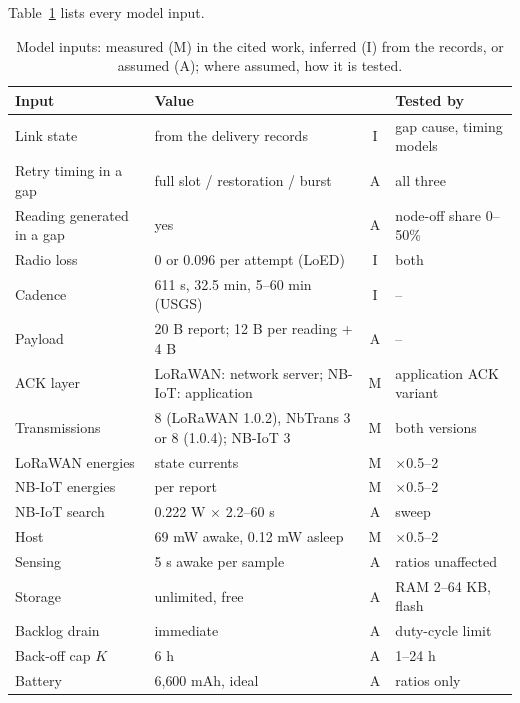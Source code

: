 \documentclass[journal]{IEEEtran}
\begin{document}
Table~\ref{tab:s-assumptions} lists every model input.

\begin{table}[t]
\centering
\caption{Model inputs: measured (M) in the cited work, inferred (I) from the records, or assumed (A); where assumed, how it is tested.}
\label{tab:s-assumptions}
\scriptsize
\setlength{\tabcolsep}{2pt}
\begin{tabular}{@{}p{2.4cm}p{3.6cm}cp{1.9cm}@{}}
\toprule
Input & Value & & Tested by \\
\midrule
Link state & from the delivery records & I & gap cause, timing models \\
Retry timing in a gap & full slot / restoration / burst & A & all three \\
Reading generated in a gap & yes & A & node-off share 0--50\% \\
Radio loss & 0 or 0.096 per attempt (LoED) & I & both \\
Cadence & 611 s, 32.5 min, 5--60 min (USGS) & I & -- \\
Payload & 20 B report; 12 B per reading + 4 B & A & -- \\
ACK layer & LoRaWAN: network server; NB-IoT: application & M & application ACK variant \\
Transmissions & 8 (LoRaWAN 1.0.2), NbTrans 3 or 8 (1.0.4); NB-IoT 3 & M & both versions \\
LoRaWAN energies & state currents~\cite{casals2017lorawan} & M & $\times$0.5--2 \\
NB-IoT energies & per report~\cite{michelinakis2021dissecting} & M & $\times$0.5--2 \\
NB-IoT search & 0.222 W $\times$ 2.2--60 s & A & sweep \\
Host & 69 mW awake, 0.12 mW asleep~\cite{libelium2020plugsense} & M & $\times$0.5--2 \\
Sensing & 5 s awake per sample & A & ratios unaffected \\
Storage & unlimited, free & A & RAM 2--64 KB, flash \\
Backlog drain & immediate & A & duty-cycle limit \\
Back-off cap $K$ & 6 h & A & 1--24 h \\
Battery & 6{,}600 mAh, ideal & A & ratios only \\
\bottomrule
\end{tabular}
\end{table}
\end{document}
